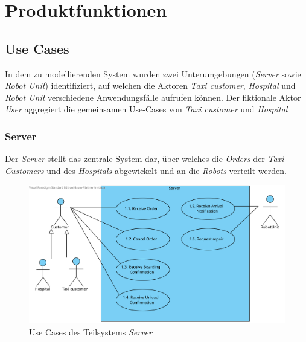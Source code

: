 \section{Produktfunktionen}

		\subsection{Use Cases}
		
		In dem zu modellierenden System wurden zwei Unterumgebungen (\emph{Server} sowie \emph{Robot Unit}) identifiziert, auf welchen die Aktoren \emph{Taxi customer}, \emph{Hospital} und \emph{Robot Unit} verschiedene Anwendungsfälle aufrufen können. Der fiktionale Aktor \emph{User} aggregiert die gemeinsamen Use-Cases von \emph{Taxi customer} und \emph{Hospital} \\
			\subsubsection{Server}
			Der \emph{Server} stellt das zentrale System dar, über welches die \emph{Orders} der \emph{Taxi Customers} und des \emph{Hospitals} abgewickelt und an die \emph{Robots} verteilt werden.
				\begin{figure}[H]
					\centering
					\includegraphics[width=1.2\textwidth]{img/2-Analyse-Server}
					\caption{Use Cases des Teilsystems \emph{Server}}
					\label{fig:3-1-server-use-cases}
				\end{figure}
			\pagebreak
